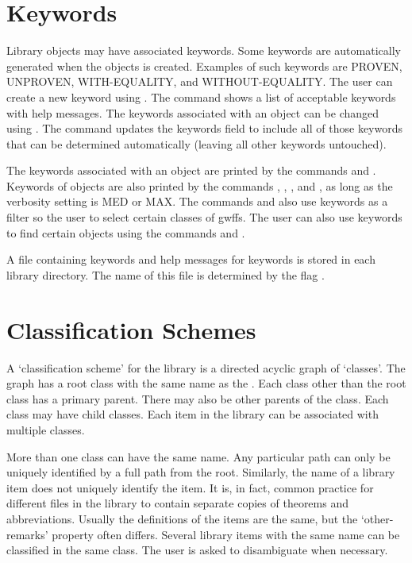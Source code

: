 \section{Keywords}\label{KEYWORDS}
Library objects may have associated keywords.  Some keywords
are automatically generated when the objects is created.
Examples of such keywords are PROVEN, UNPROVEN,
WITH-EQUALITY, and WITHOUT-EQUALITY.  The user can create a
new keyword using .  The command
shows a list of acceptable keywords
with help messages.
The keywords
associated with an object can be changed using
.
The command 
updates the keywords field to include all of those
keywords that can be determined automatically (leaving
all other keywords untouched).

The keywords associated with an object are printed by
the commands  and .
Keywords of objects are also printed by the commands
, ,
, and ,
as long as the verbosity setting is MED or MAX.  The commands
 and 
also use keywords
as a filter so the user to select certain classes of gwffs.
The user can also use keywords to find certain objects
using the commands  and .

A file containing keywords and help messages for keywords is
stored in each library directory.  The name of this file is
determined by the flag .

\section{Classification Schemes}

A `classification scheme' for the library is a directed acyclic
graph of `classes'.  The graph has a root class with the same
name as the .  Each class other than the
root class has a primary parent.  There may also be other parents
of the class.  Each class may have child classes.  Each item in
the library can be associated with multiple classes.

More than one class can have the same name.  Any particular
path can only be uniquely identified by a full path from
the root.  Similarly, the name of a library item does not
uniquely identify the item.  It is, in fact, common practice
for different files in the library to contain separate copies
of theorems and abbreviations.  Usually the definitions of
the items are the same, but the `other-remarks' property
often differs.  Several library items with the same name
can be classified in the same class.  The user is asked to
disambiguate when necessary.

